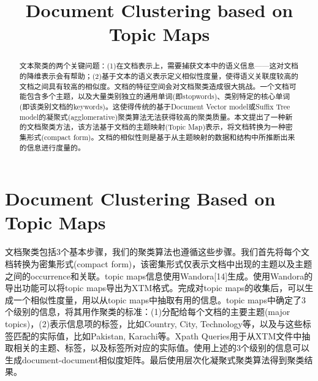 \documentclass{article}
\begin{document}
\title{Document Clustering based on Topic Maps}
\date{}
\maketitle

\begin{abstract}
文本聚类的两个关键问题：(1)在文档表示上，需要捕获文本中的语义信息——这对文档的降维表示会有帮助；(2)基于文本的语义表示定义相似性度量，使得语义关联度较高的文档之间具有较高的相似度。文档的特征空间会对文档聚类造成很大挑战。一个文档可能包含多个主题，以及大量类别独立的通用单词(即stopwords)、类别特定的核心单词(即该类别文档的keywords)。这使得传统的基于Document Vector model或Suffix Tree model的凝聚式(agglomerative)聚类算法无法获得较高的聚类质量。本文提出了一种新的文档聚类方法，该方法基于文档的主题映射(Topic Map)表示，将文档转换为一种密集形式(compact form)。文档的相似性则是基于从主题映射的数据和结构中所推断出来的信息进行度量的。
\end{abstract}

\section*{Document Clustering Based on Topic Maps}
文档聚类包括3个基本步骤，我们的聚类算法也遵循这些步骤。我们首先将每个文档转换为密集形式(compact form)，该密集形式仅表示文档中出现的主题以及主题之间的occurrence和关联。topic maps信息使用Wandora[14]生成。使用Wandora的导出功能可以将topic maps导出为XTM格式。完成对topic maps的收集后，可以生成一个相似性度量，用以从topic maps中抽取有用的信息。topic maps中确定了3个级别的信息，将其用作聚类的标准：(1)分配给每个文档的主要主题(major topics)，(2)表示信息项的标签，比如Country, City, Technology等，以及与这些标签匹配的实际值，比如Pakistan, Karachi等。Xpath Queries用于从XTM文件中抽取相关的主题、标签，以及标签所对应的实际值。使用上述的3个级别的信息可以生成document-document相似度矩阵。最后使用层次化凝聚式聚类算法得到聚类结果。
\end{document}
